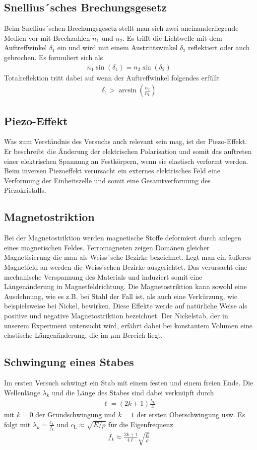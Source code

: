 \documentclass[a4paper, 12pt]{scrartcl}
\begin{document}
\subsection{Snellius´sches Brechungsgesetz}
Beim Snellius´schen Brechungsgesetz stellt man sich zwei aneinanderliegende Medien vor mit Brechzahlen $n_1$ und $n_2$. Es trifft die Lichtwelle mit dem Auftreffwinkel $\delta_1$ ein und wird mit einem Austrittswinkel $\delta_2$ reflektiert oder auch gebrochen. Es formuliert sich als 
\begin{align}
n_1 \sin(\delta_1) = n_2 \sin(\delta_2)
\end{align}
Totalreflektion tritt dabei auf wenn der Auftreffwinkel folgendes erfüllt
\begin{align}
\delta_1 > \arcsin\left( \frac{n_2}{n_1} \right) 
\end{align}
\subsection{Piezo-Effekt}
Was zum Verständnis des Versuchs auch relevant sein mag, ist der Piezo-Effekt. Er beschreibt die Änderung der elektrischen Polarisation und somit das auftreten einer elektrischen Spannung an Festkörpern, wenn sie elastisch verformt werden. Beim inversen Piezoeffekt verursacht ein externes elektrisches Feld eine Verformung der Einheitszelle und somit eine Gesamtverformung des Piezokristalls.
\subsection{Magnetostriktion}
Bei der Magnetostriktion werden magnetische Stoffe deformiert durch anlegen eines magnetischen Feldes. Ferromagneten zeigen Domänen gleicher Magnetisierung die man als Weiss´sche Bezirke bezeichnet. Legt man ein äußeres Magnetfeld an werden die Weiss'schen Bezirke ausgerichtet. Das verursacht eine mechanische Verspannung des Materials und induziert somit eine Längenänderung in Magnetfeldrichtung. Die Magnetostriktion kann sowohl eine Ausdehnung, wie es z.B. bei Stahl der Fall ist, als auch eine Verkürzung, wie beispielsweise bei Nickel, bewirken. Diese Effekte werde auf natürliche Weise als positive und negative Magnetostriktion bezeichnet. Der Nickelstab, der in unserem Experiment untersucht wird, erfährt dabei bei konstantem Volumen eine elastische Längenänderung, die im $\mu$m-Bereich liegt.
\subsection{Schwingung eines Stabes}
Im ersten Versuch schwingt ein Stab mit einem festen und einem freien Ende. Die Wellenlänge $\lambda_k$ und die Länge des Stabes sind dabei verknüpft durch 
\begin{align}
\ell = (2k+1)\frac{\lambda_k}{4}
\end{align}
mit $k=0$ der Grundschwingung und $k=1$ der ersten Oberschwingung usw. Es folgt mit $\lambda_k=\frac{c_\textrm{L}}{f_k}$ und $c_\textrm{L} \approx \sqrt{E/\rho}$ für die Eigenfrequenz 
\begin{align}
f_k\approx  \frac{2k+1}{4\ell} \sqrt{\frac{E}{\rho}}
\end{align}
\end{document}
